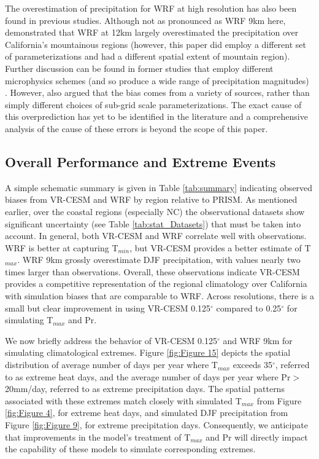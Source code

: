 \documentclass[draft,ms]{agutex}   %
\begin{document}
\begin{article}
The overestimation of precipitation for WRF at high resolution has also been found in previous studies. Although not as pronounced as WRF 9km here, \citet{caldwell2009evaluation} demonstrated that WRF at 12km largely overestimated the precipitation over California's mountainous regions (however, this paper did employ a different set of parameterizations and had a different spatial extent of mountain region). Further discussion can be found in former studies that employ different microphysics schemes (and so produce a wide range of precipitation magnitudes) \citep{jankov2005impact, chin2010preliminary, caldwell2010california}. However, \citet{caldwell2009evaluation} also argued that the bias comes from a variety of sources, rather than simply different choices of sub-grid scale parameterizations. The exact cause of this overprediction has yet to be identified in the literature and a comprehensive analysis of the cause of these errors is beyond the scope of this paper. 

\subsection{Overall Performance and Extreme Events}

A simple schematic summary is given in Table \ref{tab:summary} indicating observed biases from VR-CESM and WRF by region relative to PRISM. As mentioned earlier, over the coastal regions (especially NC) the observational datasets show significant uncertainty (see Table \ref{tab:stat_Datasets}) that must be taken into account. In general, both VR-CESM and WRF correlate well with observations. WRF is better at capturing T$_{min}$, but VR-CESM provides a better estimate of T$_{max}$.  WRF 9km grossly overestimate DJF precipitation, with values nearly two times larger than observations.  Overall, these observations indicate VR-CESM provides a competitive representation of the regional climatology over California with simulation biases that are comparable to WRF. Across resolutions, there is a small but clear improvement in using VR-CESM 0.125$^\circ$ compared to 0.25$^\circ$ for simulating T$_{max}$ and Pr.

We now briefly address the behavior of VR-CESM 0.125$^\circ$ and WRF 9km for simulating climatological extremes.  Figure \ref{fig:Figure 15} depicts the spatial distribution of average number of days per year where T$_{max}$ exceeds 35$^\circ$, referred to as extreme heat days, and the average number of days per year where Pr$>$20mm/day, referred to as extreme precipitation days.  The spatial patterns associated with these extremes match closely with simulated T$_{max}$ from Figure \ref{fig:Figure 4}, for extreme heat days, and simulated DJF precipitation from Figure \ref{fig:Figure 9}, for extreme precipitation days.  Consequently, we anticipate that improvements in the model's treatment of T$_{max}$ and Pr will directly impact the capability of these models to simulate corresponding extremes.


\end{article}
\end{document}
